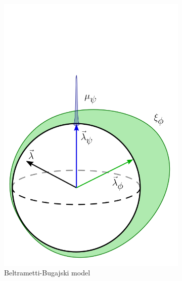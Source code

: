 \documentclass[%
 reprint,
superscriptaddress,
nofootinbib,
 amsmath,amssymb,
 prx, 
 accepted=2019-09-27,
]{quantumarticle}
\begin{document}
\begin{figure}[t]
\begin{subfigure}[t]{0.24\textwidth}
 \includegraphics[width=\textwidth]{BB_model_v3.png}
 \caption{Beltrametti-Bugajski model}
 \label{fig:BBmodel}
 \end{subfigure}
 \begin{subfigure}[t]{0.24\textwidth}

\end{subfigure}
\end{figure}
\end{document}
